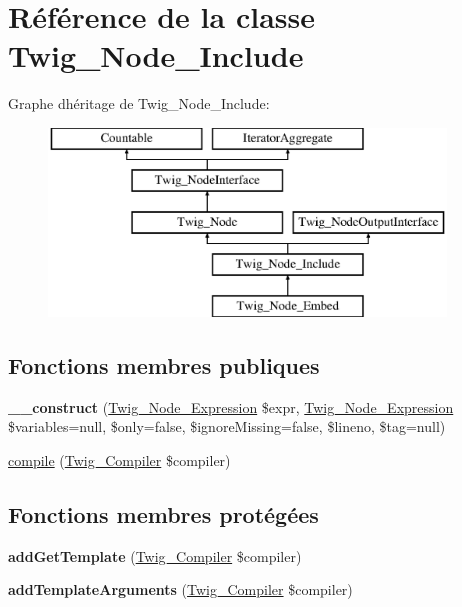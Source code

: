 \hypertarget{class_twig___node___include}{}\section{Référence de la classe Twig\+\_\+\+Node\+\_\+\+Include}
\label{class_twig___node___include}
Graphe d\textquotesingle{}héritage de Twig\+\_\+\+Node\+\_\+\+Include\+:\begin{figure}[H]
\begin{center}
\leavevmode
\includegraphics[height=5.000000cm]{class_twig___node___include}
\end{center}
\end{figure}
\subsection*{Fonctions membres publiques}
\begin{DoxyCompactItemize}
\item 
{\bfseries \+\_\+\+\_\+construct} (\hyperlink{class_twig___node___expression}{Twig\+\_\+\+Node\+\_\+\+Expression} \$expr, \hyperlink{class_twig___node___expression}{Twig\+\_\+\+Node\+\_\+\+Expression} \$variables=null, \$only=false, \$ignore\+Missing=false, \$lineno, \$tag=null)\hypertarget{class_twig___node___include_aba87c03dc7341434c78faeb942409ff6}{}\label{class_twig___node___include_aba87c03dc7341434c78faeb942409ff6}

\item 
\hyperlink{class_twig___node___include_a4e0faa87c3fae583620b84d3607085da}{compile} (\hyperlink{class_twig___compiler}{Twig\+\_\+\+Compiler} \$compiler)
\end{DoxyCompactItemize}
\subsection*{Fonctions membres protégées}
\begin{DoxyCompactItemize}
\item 
{\bfseries add\+Get\+Template} (\hyperlink{class_twig___compiler}{Twig\+\_\+\+Compiler} \$compiler)\hypertarget{class_twig___node___include_a899e31f4c948a6fd44a4ec27c4dbe5a3}{}\label{class_twig___node___include_a899e31f4c948a6fd44a4ec27c4dbe5a3}

\item 
{\bfseries add\+Template\+Arguments} (\hyperlink{class_twig___compiler}{Twig\+\_\+\+Compiler} \$compiler)\hypertarget{class_twig___node___include_a6006862bbfd7b8b4f132b41aba242a61}{}\label{class_twig___node___include_a6006862bbfd7b8b4f132b41aba242a61}

\end{DoxyCompactItemize}
